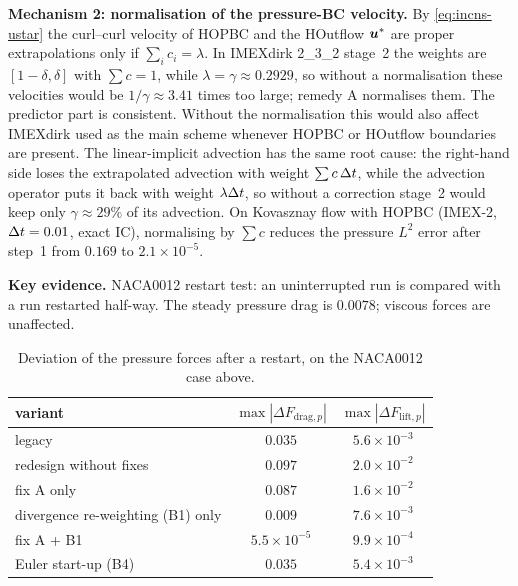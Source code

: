 \textbf{Mechanism 2: normalisation of the pressure-BC velocity.} By
\eqref{eq:incns-ustar} the curl--curl velocity of HOPBC and the HOutflow
$\boldsymbol{u}^*$ are proper extrapolations only if $\sum_ic_i=\lambda$. In
IMEXdirk 2\_3\_2 stage~2 the weights are $[1-\delta,\delta]$ with
$\sum c=1$, while $\lambda=\gamma\approx0.2929$, so without a normalisation
these velocities would be $1/\gamma\approx3.41$ times too large; remedy A
normalises them. The predictor part is consistent. Without the normalisation
this would also affect IMEXdirk used as the main scheme whenever HOPBC or
HOutflow boundaries are present. The linear-implicit advection has the same
root cause: the right-hand side loses the extrapolated advection with weight
$\sum c\,\Delta t$, while the advection operator puts it back with weight
$\lambda\Delta t$, so without a correction stage~2 would keep only
$\gamma\approx29\%$ of its advection. On Kovasznay flow with HOPBC (IMEX-2,
$\Delta t=0.01$, exact IC), normalising by $\sum c$ reduces the pressure
$L^2$ error after step~1 from $0.169$ to $2.1\times10^{-5}$.

\textbf{Key evidence.} NACA0012 restart test: an uninterrupted run is
compared with a run restarted half-way. The steady pressure drag is
$0.0078$; viscous forces are unaffected.

\begin{table}[htbp]
\centering
\small
\begin{tabular}{@{}lcc@{}}
\toprule
variant & $\max|\Delta F_{\mathrm{drag},p}|$ & $\max|\Delta F_{\mathrm{lift},p}|$ \\
\midrule
legacy & $0.035$ & $5.6\times10^{-3}$ \\
redesign without fixes & $0.097$ & $2.0\times10^{-2}$ \\
fix A only & $0.087$ & $1.6\times10^{-2}$ \\
divergence re-weighting (B1) only & $0.009$ & $7.6\times10^{-3}$ \\
fix A + B1 & $5.5\times10^{-5}$ & $9.9\times10^{-4}$ \\
Euler start-up (B4) & $0.035$ & $5.4\times10^{-3}$ \\
\bottomrule
\end{tabular}
\caption{Deviation of the pressure forces after a restart, on the
NACA0012 case above.}
\label{tab:incns-kick-evidence}
\end{table}


